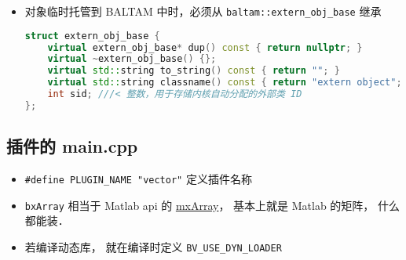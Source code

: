
\begin{issues}
\issueDraft
\end{issues}

\begin{itemize}
\item 对象临时托管到 BALTAM 中时，必须从 \verb|baltam::extern_obj_base| 继承
\begin{lstlisting}[language=cpp, caption=extern\_obj.h节选]
struct extern_obj_base {
    virtual extern_obj_base* dup() const { return nullptr; }
    virtual ~extern_obj_base() {};
    virtual std::string to_string() const { return ""; }
    virtual std::string classname() const { return "extern object"; };
    int sid; ///< 整数，用于存储内核自动分配的外部类 ID
};
\end{lstlisting}
\end{itemize}

\subsection{插件的 main.cpp}
\begin{itemize}
\item \verb|#define PLUGIN_NAME "vector"| 定义插件名称
\item \verb|bxArray| 相当于 Matlab api 的 \href{https://www.mathworks.com/help/matlab/apiref/mxarray.html}{mxArray}， 基本上就是 Matlab 的矩阵， 什么都能装．
\item 若编译动态库， 就在编译时定义 \verb|BV_USE_DYN_LOADER|
\end{itemize}


